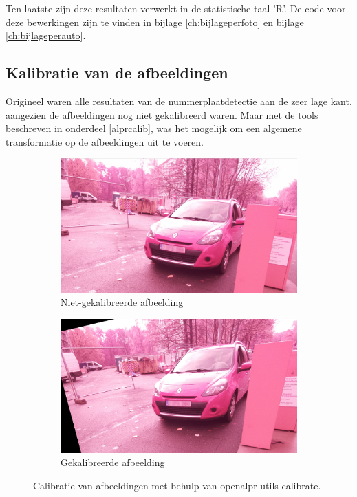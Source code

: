 Ten laatste zijn deze resultaten verwerkt in de statistische taal 'R'. De code voor deze bewerkingen zijn te vinden in bijlage \ref{ch:bijlageperfoto} en bijlage \ref{ch:bijlageperauto}.

\subsection{Kalibratie van de afbeeldingen}
Origineel waren alle resultaten van de nummerplaatdetectie aan de zeer lage kant, aangezien de afbeeldingen nog niet gekalibreerd waren. Maar met de tools beschreven in onderdeel \ref{alprcalib}, was het mogelijk om een algemene transformatie op de afbeeldingen uit te voeren.
\begin{figure}[h!]
	\centering
	\begin{subfigure}[b]{0.4\linewidth}
		\includegraphics[width=\linewidth]{img/calibration/pre-calibrate.png}
		\caption{Niet-gekalibreerde afbeelding}
	\end{subfigure}
	\begin{subfigure}[b]{0.4\linewidth}
		\includegraphics[width=\linewidth]{img/calibration/calibrate-cut.png}
		\caption{Gekalibreerde afbeelding}
	\end{subfigure}
	\label{fig:calibration}
	\caption{Calibratie van afbeeldingen met behulp van openalpr-utils-calibrate.}
\end{figure}

